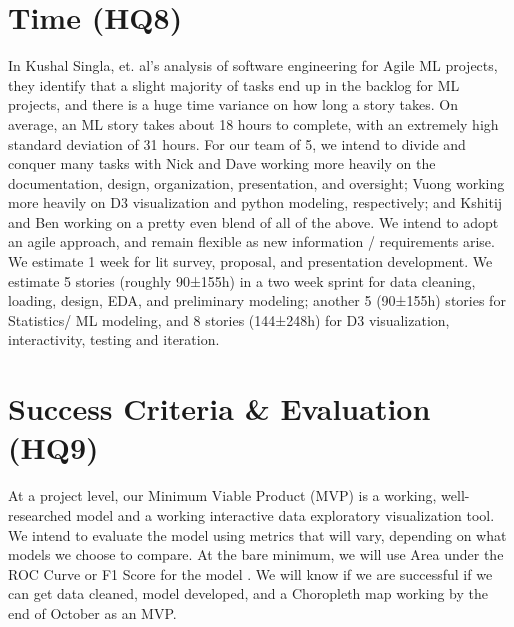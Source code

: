\documentclass[sigconf,nonacm,11pt]{acmart}
\begin{document}
\section{Time (HQ8)}
In Kushal Singla, et. al's analysis \cite{mltime} of software engineering for Agile ML projects, they identify that a slight majority of tasks end up in the backlog for ML projects, and there is a huge time variance on how long a story takes. On average, an ML story takes about 18 hours to complete, with an extremely high standard deviation of 31 hours.  For our team of 5, we intend to divide and conquer many tasks with Nick and Dave working more heavily on the documentation, design, organization, presentation, and oversight; Vuong working more heavily on D3 visualization and python modeling, respectively; and Kshitij and Ben working on a pretty even blend of all of the above.  We intend to adopt an agile approach, and remain flexible as new information / requirements arise.  We estimate 1 week for lit survey, proposal, and presentation development.  We estimate 5 stories (roughly 90±155h) in a two week sprint for data cleaning, loading, design, EDA, and preliminary modeling; another 5 (90±155h) stories for Statistics/ ML modeling, and 8 stories (144±248h) for D3 visualization, interactivity, testing and iteration.

\section{Success Criteria \& Evaluation (HQ9)}
At a project level, our Minimum Viable Product (MVP) is a working, well-researched model and a working interactive data exploratory visualization tool. We intend to evaluate the model using metrics that will vary, depending on what models we choose to compare.  At the bare minimum, we will use Area under the ROC Curve or F1 Score for the model \cite{isl} . We will know if we are successful if we can get data cleaned, model developed, and a Choropleth map working by the end of October as an MVP.

\end{document}
